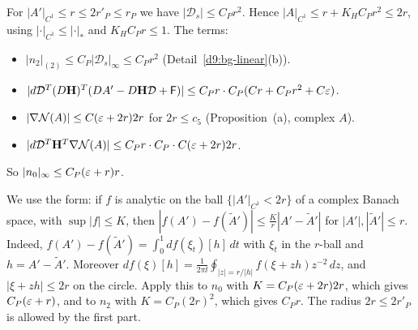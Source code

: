 \begin{detail}\label{d9:gradVs}
\begin{step}[Size]
For $|A'|_{C^1}\le r\le2r'_P\le r_P$ we have $|\mathcal D_s|\le C_Pr^2$. Hence $|A|_{C^1}\le r+K_HC_Pr^2\le2r$, using $|\cdot|_{C^1}\le|\cdot|_*$ and $K_HC_Pr\le1$. The terms:
\begin{itemize}
\item $|n_2|_{(2)}\le C_P|\mathcal D_s|_\infty\le C_Pr^2$ (Detail~\ref{d9:bg-linear}(b)).
\item $|d\mathcal D^T(D\mathbf H)^T(DA'-D\mathbf H\mathcal D+\mathsf F)|\le C_Pr\cdot C_P(Cr+C_Pr^2+C\varepsilon)$.
\item $|\nabla\mathcal N(A)|\le C(\varepsilon+2r)2r$ for $2r\le c_5$ (Proposition~(a), complex $A$).
\item $|d\mathcal D^T\mathbf H^T\nabla\mathcal N(A)|\le C_Pr\cdot C_P\cdot C(\varepsilon+2r)2r$.
\end{itemize}
So $|n_0|_\infty\le C_P(\varepsilon+r)r$.
\end{step}
\begin{step}
We use the form: if $f$ is analytic on the ball $\{|A'|_{C^1}<2r\}$ of a complex Banach space, with $\sup|f|\le K$, then $|f(A')-f(\tilde A')|\le\frac Kr|A'-\tilde A'|$ for $|A'|,|\tilde A'|\le r$. Indeed, $f(A')-f(\tilde A')=\int_0^1df(\xi_t)[h]\,dt$ with $\xi_t$ in the $r$-ball and $h=A'-\tilde A'$. Moreover $df(\xi)[h]=\frac1{2\pi\ii}\oint_{|z|=r/|h|}f(\xi+zh)z^{-2}\,dz$, and $|\xi+zh|\le2r$ on the circle. Apply this to $n_0$ with $K=C_P(\varepsilon+2r)2r$, which gives $C_P(\varepsilon+r)$, and to $n_2$ with $K=C_P(2r)^2$, which gives $C_Pr$. The radius $2r\le2r'_P$ is allowed by the first part.
\end{step}
\end{detail}

